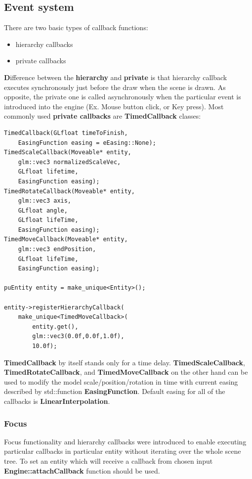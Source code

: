 \documentclass{article}
\begin{document}
\newpage
\subsection{Event system}\label{sec:Event system}
\indent \indent There are two basic types of callback functions:
\begin{itemize}
\item hierarchy callbacks
\item private callbacks
\end{itemize}

\indent \indent \textbf Difference between the \textbf{hierarchy} and \textbf{private} is that hierarchy callback executes synchronously just before the draw when the scene is drawn. As opposite, the private one is called asynchronously when the particular event is introduced into the engine (Ex. Mouse button click, or Key press). Most commonly used \textbf{private callbacks} are \textbf{TimedCallback} classes:

\begin{lstlisting}
TimedCallback(GLfloat timeToFinish,
	EasingFunction easing = eEasing::None);
TimedScaleCallback(Moveable* entity,
	glm::vec3 normalizedScaleVec,
	GLfloat lifetime,
	EasingFunction easing);
TimedRotateCallback(Moveable* entity,
	glm::vec3 axis,
	GLfloat angle,
	GLfloat lifeTime,
	EasingFunction easing);
TimedMoveCallback(Moveable* entity,
	glm::vec3 endPosition,
	GLfloat lifeTime,
	EasingFunction easing);
                  
puEntity entity = make_unique<Entity>();

entity->registerHierarchyCallback(
	make_unique<TimedMoveCallback>(
		entity.get(),
		glm::vec3(0.0f,0.0f,1.0f),
		10.0f);
\end{lstlisting}

\indent \indent \textbf{TimedCallback} by itself stands only for a time delay. \textbf{TimedScaleCallback}, \textbf{TimedRotateCallback}, and \textbf{TimedMoveCallback} on the other hand can be used to modify the model scale/position/rotation in time with current easing described by std::function \textbf{EasingFunction}. Default easing for all of the callbacks is \textbf{LinearInterpolation}.
\newpage

\subsubsection{Focus}\label{sec:Focus}
\indent \indent Focus functionality and hierarchy callbacks were introduced to enable executing particular callbacks in particular entity without iterating over the whole scene tree. To set an entity which will receive a callback from chosen input \textbf{Engine::attachCallback} function should be used.
\newline
\end{document}
